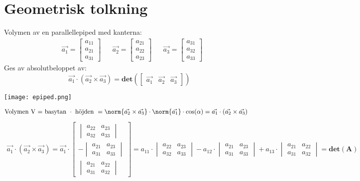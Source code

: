 \section{Geometrisk tolkning} %
\label{sec:geometrisk_tolkning}
Volymen av en parallellepiped med kanterna:
\begin{align*}
 &\vec{a_1} = \begin{bmatrix} a_{11}\\a_{21}\\a_{31} \end{bmatrix}
 &&\vec{a_2} = \begin{bmatrix} a_{21}\\a_{22}\\a_{23} \end{bmatrix}
 &&\vec{a_3} = \begin{bmatrix} a_{31}\\a_{32}\\a_{33} \end{bmatrix}
 \end{align*}
 Ges av absolutbeloppet av:
 \[
     \vec{a_1} \cdot (\vec{a_2} \times \vec{a_3}) = \mathbf{det}(\begin{bmatrix} \vec{a_1}&\vec{a_2}&\vec{a_3} \end{bmatrix})
 \]
\begin{center}
    \texttt{[image: epiped.png]}
\end{center}
\begin{align*}
\mbox{Volymen V = basytan }\cdot\mbox{ höjden } &= \norm{\vec{a_2} \times \vec{a_3}} \cdot \norm{\vec{a_1}} \cdot \cos(\alpha) = \vec{a_1} \cdot (\vec{a_2} \times \vec{a_3})
\end{align*}
\begin{align*}
\vec{a_1} \cdot (\vec{a_2} \times \vec{a_3}) = \vec{a_1} \cdot 
\begin{bmatrix} 
\begin{vmatrix} a_{22}&a_{23}\\a_{32}&a_{33} \end{vmatrix} \\
- \begin{vmatrix} a_{21}&a_{23}\\a_{31}&a_{33} \end{vmatrix} \\
\begin{vmatrix} a_{21}&a_{22}\\a_{31}&a_{32} \end{vmatrix}
\end{bmatrix} = a_{11} \cdot \begin{vmatrix} a_{22}&a_{23}\\a_{32}&a_{33} \end{vmatrix} - a_{12} \cdot \begin{vmatrix} a_{21}&a_{23}\\a_{31}&a_{33} \end{vmatrix} + a_{13} \cdot \begin{vmatrix} a_{21}&a_{22}\\a_{31}&a_{32} \end{vmatrix} = \mathbf{det}(\mathbf{A})
\end{align*}
